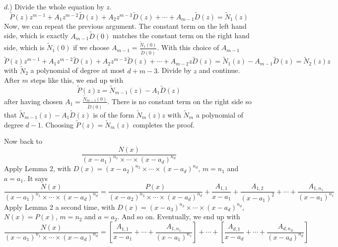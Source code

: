 \(d\).) Divide the whole equation by \(z\).
\[
\tilde{P}(z)z^{m-1} + A_1 z^{m-2} \tilde{D}(z) + A_2 z^{m-3} \tilde{D}(z) + \cdots + A_{m-1} \tilde{D}(z) = \tilde{N}_1(z)
\]
Now, we can repeat the previous argument. The constant term on the left hand side, which
is exactly \(A_{m-1} \tilde{D}(0)\) matches the constant term on the right hand side, which is \(\tilde{N}_1(0)\) if we
choose \(A_{m-1} = \frac{\tilde{N}_1(0)}{\tilde{D}(0)}\). With this choice of \(A_{m-1}\)
\[
\tilde{P}(z)z^{m-1} + A_1 z^{m-2} \tilde{D}(z) + A_2 z^{m-3} \tilde{D}(z) + \cdots + A_{m-2} z \tilde{D}(z) = \tilde{N}_1(z) - A_{m-1} \tilde{D}(z) = \tilde{N}_2(z)z
\]
with \(\tilde{N}_2\) a polynomial of degree at most \(d + m - 3\). Divide by \(z\) and continue. After \(m\) steps
like this, we end up with
\[
\tilde{P}(z)z = \tilde{N}_{m-1}(z) - A_1 \tilde{D}(z)
\]
after having chosen \(A_1 = \frac{\tilde{N}_{m-1}(0)}{\tilde{D}(0)}\). There is no constant term on the right side so that
\(\tilde{N}_{m-1}(z) - A_1 \tilde{D}(z)\) is of the form \(\tilde{N}_m(z)z\) with \(\tilde{N}_m\) a polynomial of degree \(d - 1\). Choosing
\(\tilde{P}(z) = \tilde{N}_m(z)\) completes the proof.

Now back to
\[
\frac{N(x)}{{(x-a_1)}^{n_1} \times \cdots \times {(x-a_d)}^{n_d}}
\]
Apply Lemma 2, with \(D(x) = {(x - a_2)}^{n_2} \times \cdots \times {(x - a_d)}^{n_d}\), \(m = n_1\) and \(a = a_1\). It says
\[
\frac{N(x)}{{(x-a_1)}^{n_1} \times \cdots \times {(x-a_d)}^{n_d}} = \frac{P(x)}{{(x-a_2)}^{n_2} \times \cdots \times {(x-a_d)}^{n_d}} + \frac{A_{1,1}}{x-a_1} + \frac{A_{1,2}}{{(x-a_1)}^2} + \cdots + \frac{A_{1,n_1}}{{(x-a_1)}^{n_1}}
\]
Apply Lemma 2 a second time, with \(D(x) = {(x - a_3)}^{n_3} \times \cdots \times {(x - a_d)}^{n_d}\), \(N(x) = P(x)\),
\(m = n_2\) and \(a = a_2\). And so on. Eventually, we end up with
\[
\frac{N(x)}{{(x-a_1)}^{n_1} \times \cdots \times {(x-a_d)}^{n_d}} = \left[ \frac{A_{1,1}}{x-a_1} + \cdots + \frac{A_{1,n_1}}{{(x-a_1)}^{n_1}} \right] + \cdots + \left[ \frac{A_{d,1}}{x-a_d} + \cdots + \frac{A_{d,n_d}}{{(x-a_d)}^{n_d}} \right]
\]
